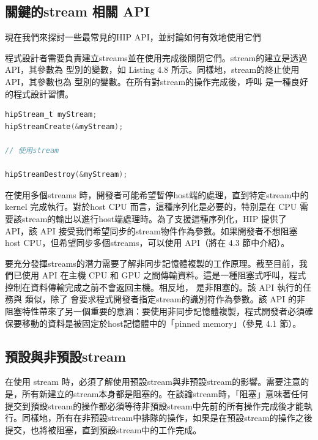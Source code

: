 \subsection{關鍵的stream 相關 API}
現在我們來探討一些最常見的HIP API，並討論如何有效地使用它們

程式設計者需要負責建立streams並在使用完成後關閉它們。stream的建立是透過  API，其參數為  型別的變數，如 Listing 4.8 所示。同樣地，stream的終止使用  API，其參數也為  型別的變數。在所有對stream的操作完成後，呼叫  是一種良好的程式設計習慣。

\begin{lstlisting}[language=C, caption={創建與關閉stream}, label={8th:example}]
hipStream_t myStream;
hipStreamCreate(&myStream);

// 使用stream

hipStreamDestroy(&myStream);
\end{lstlisting}

在使用多個streams 時，開發者可能希望暫停host端的處理，直到特定stream中的 kernel 完成執行。對於host CPU 而言，這種序列化是必要的，特別是在 CPU 需要該stream的輸出以進行host端處理時。為了支援這種序列化，HIP 提供了  API，該 API 接受我們希望同步的stream物件作為參數。如果開發者不想阻塞host CPU，但希望同步多個streams，可以使用  API（將在 4.3 節中介紹）。

要充分發揮streams的潛力需要了解非同步記憶體複製的工作原理。截至目前，我們已使用  API 在主機 CPU 和 GPU 之間傳輸資料。這是一種阻塞式呼叫，程式控制在資料傳輸完成之前不會返回主機。相反地， 是非阻塞的。該 API 執行的任務與  類似，除了  會要求程式開發者指定stream的識別符作為參數。該 API 的非阻塞特性帶來了另一個重要的意涵：要使用非同步記憶體複製，程式開發者必須確保要移動的資料是被固定於host記憶體中的「pinned memory」（參見 4.1 節）。

\subsection{預設與非預設stream}
在使用 stream 時，必須了解使用預設stream與非預設stream的影響。需要注意的是，所有新建立的stream本身都是阻塞的。在談論stream時，「阻塞」意味著任何提交到預設stream的操作都必須等待非預設stream中先前的所有操作完成後才能執行。同樣地，所有在非預設stream中排隊的操作，如果是在預設stream的操作之後提交，也將被阻塞，直到預設stream中的工作完成。

